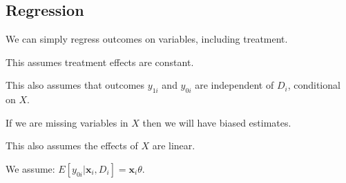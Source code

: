 
\subsection{Regression}

We can simply regress outcomes on variables, including treatment.

This assumes treatment effects are constant.

This also assumes that outcomes \(y_{1i}\) and \(y_{0i}\) are independent of \(D_i\), conditional on \(X\).

If we are missing variables in \(X\) then we will have biased estimates.

This also assumes the effects of \(X\) are linear.

We assume: \(E[y_{0i}|\mathbf x_{i}, D_i]=\mathbf x_i \theta\).

